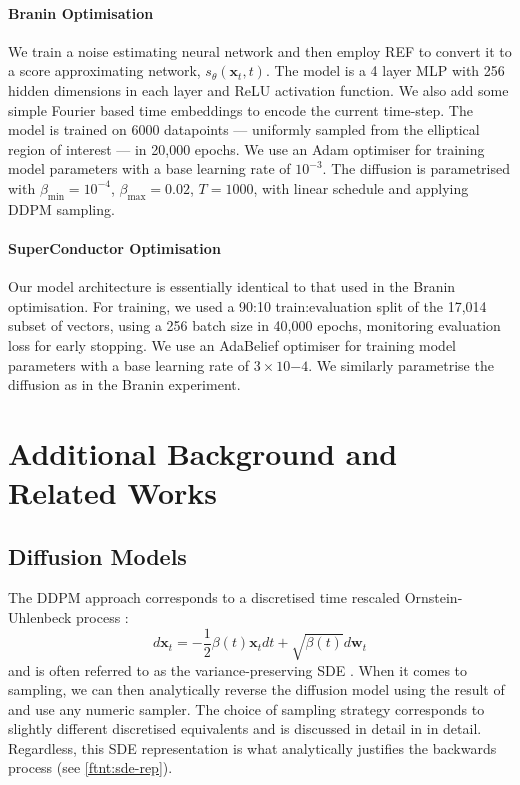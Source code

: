 \paragraph{Branin Optimisation} We train a noise estimating neural network and then employ
REF to convert it to a score approximating network, $s_\theta(\mathbf{x}_t, t)$.
The model is a 4 layer MLP with 256 hidden dimensions in each layer and ReLU activation function.
We also add some simple Fourier based time embeddings to encode the current time-step. The model
is trained on 6000 datapoints --- uniformly sampled from the elliptical region of interest --- in
20,000 epochs. We use an Adam optimiser for training model parameters with a base learning rate of
$10^{-3}$. The diffusion is parametrised with $\beta_{\text{min}}=10^{-4}$,
$\beta_{\text{max}}=0.02$, $T=1000$, with linear schedule and applying DDPM sampling.

\paragraph{SuperConductor Optimisation} Our model architecture is essentially identical to that used
in the Branin optimisation. For training, we used a 90:10 train:evaluation split of the 17,014
subset of vectors, using a 256 batch size in 40,000 epochs, monitoring evaluation loss for early
stopping. We use an AdaBelief optimiser for training model parameters with a base learning rate of
$3\times 10{-4}$. We similarly parametrise the diffusion as in the Branin experiment.

\newpage

\section{Additional Background and Related Works} \label{sec:extra}

\subsection{Diffusion Models}

\begin{remark} \label{rem:sde-rep}
    The DDPM approach corresponds to a discretised time rescaled Ornstein-Uhlenbeck process
    \parencite{boysTweedieMomentProjected2023,songScoreBasedGenerativeModeling2021}:
    $$
    d\mathbf{x}_t = -\frac{1}{2}\beta(t)\mathbf{x}_t dt + \sqrt{\beta(t)}d\mathbf{w}_t
    $$
    and is often referred to as the variance-preserving SDE
    \parencite{songScoreBasedGenerativeModeling2021}. When it comes to sampling, we can then
    analytically reverse the diffusion model using the result of
    \textcite{andersonReversetimeDiffusionEquation1982} and use any numeric sampler. The choice
    of sampling strategy corresponds to slightly different discretised equivalents and is discussed
    in detail in \textcite{songScoreBasedGenerativeModeling2021} in detail.
    Regardless, this SDE representation is what analytically justifies the backwards process
    (see \autoref{ftnt:sde-rep}).
\end{remark}

